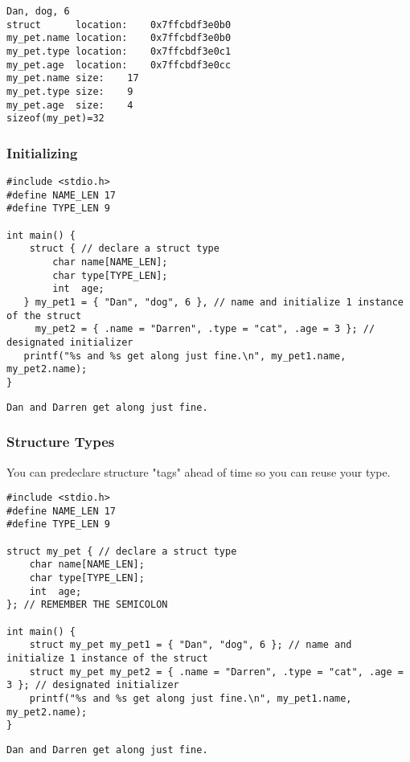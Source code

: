 \documentclass[11pt]{article}
\begin{document}
\begin{verbatim}
Dan, dog, 6
struct      location:	 0x7ffcbdf3e0b0
my_pet.name location:	 0x7ffcbdf3e0b0
my_pet.type location:	 0x7ffcbdf3e0c1
my_pet.age  location:	 0x7ffcbdf3e0cc
my_pet.name size:	 17
my_pet.type size:	 9
my_pet.age  size:	 4
sizeof(my_pet)=32
\end{verbatim}

\subsubsection{Initializing}
\label{sec:org9f72d5c}

\begin{verbatim}
#include <stdio.h>
#define NAME_LEN 17
#define TYPE_LEN 9

int main() {
    struct { // declare a struct type
        char name[NAME_LEN];
        char type[TYPE_LEN];
        int  age;
   } my_pet1 = { "Dan", "dog", 6 }, // name and initialize 1 instance of the struct
     my_pet2 = { .name = "Darren", .type = "cat", .age = 3 }; // designated initializer
   printf("%s and %s get along just fine.\n", my_pet1.name, my_pet2.name);
}
\end{verbatim}

\begin{verbatim}
Dan and Darren get along just fine.
\end{verbatim}


\subsubsection{Structure Types}
\label{sec:org90e16a5}

You can predeclare structure "tags" ahead of time so you can reuse your type.

\begin{verbatim}
#include <stdio.h>
#define NAME_LEN 17
#define TYPE_LEN 9

struct my_pet { // declare a struct type
    char name[NAME_LEN];
    char type[TYPE_LEN];
    int  age;
}; // REMEMBER THE SEMICOLON

int main() {
    struct my_pet my_pet1 = { "Dan", "dog", 6 }; // name and initialize 1 instance of the struct
    struct my_pet my_pet2 = { .name = "Darren", .type = "cat", .age = 3 }; // designated initializer
    printf("%s and %s get along just fine.\n", my_pet1.name, my_pet2.name);
}
\end{verbatim}

\begin{verbatim}
Dan and Darren get along just fine.
\end{verbatim}
\end{document}
